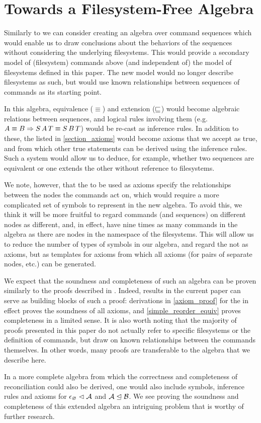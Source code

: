 
\section{Towards a Filesystem-Free Algebra}

Similarly to \cite{NREC} we can consider creating an algebra over command sequences
which would enable us to draw conclusions about the behaviors of the sequences
without considering the underlying filesystems.
This would provide a secondary model of (filesystem) commands above (and independent of) the model of filesystems
defined in this paper. The new model would no longer describe filesystems as such,
but would use known relationships between sequences of commands as its starting point.

In this algebra, equivalence ($\equiv$) and extension ($\sqsubseteq$) would become algebraic relations
between sequences, and logical rules involving them
(e.g. $ A\equiv B \Rightarrow S\, A\, T\equiv S\, B\, T $) would be re-cast as inference rules.
In addition to these, the  listed in \cref{section_axioms}
would become axioms that we accept as true, and from which other true statements can be derived
using the inference rules.
Such a system would allow us to deduce, for example, whether two sequences are equivalent
or one extends the other without reference to filesystems.

We note, however, that the  to be used as axioms 
specify the relationships between the nodes
the commands act on, which would require a more complicated set of symbols to represent
in the new algebra.
To avoid this, we think it will be more fruitful to regard commands (and sequences)
on different nodes as different, and, in effect, have nine times as many commands 
in the algebra as there are nodes in the namespace of the filesystems.
This will allow us to reduce the number of types of symbols in our algebra, and regard
the  not as axioms, but as templates for axioms
from which all axioms (for pairs of separate nodes, etc.) can be generated.

We expect that the soundness and completeness of such an algebra can be proven
similarly to the proofs described in \cite{NREC}.
Indeed, results in the current paper can serve as building blocks of such a proof:
derivations in \cref{axiom_proof} for the 
in effect proves the soundness of all axioms,
and \cref{simple_reorder_equiv} proves completeness in a limited sense.
It is also worth noting that the majority of proofs presented in this paper
do not actually refer to specific filesystems or the definition of commands,
but draw on known relationships between the commands themselves.
In other words, many proofs are transferable to the algebra that we describe here.

In a more complete algebra from which the correctness and completeness
of reconciliation could also be derived,
one would also include symbols, inference rules and axioms for 
${\epsilon_\varnothing}\vartriangleleft{\mathcal{A}}$ and ${\mathcal{A}}\trianglelefteq{\mathcal{B}}$.
We see proving the soundness and completeness of this extended algebra
an intriguing problem that is worthy of further research.

